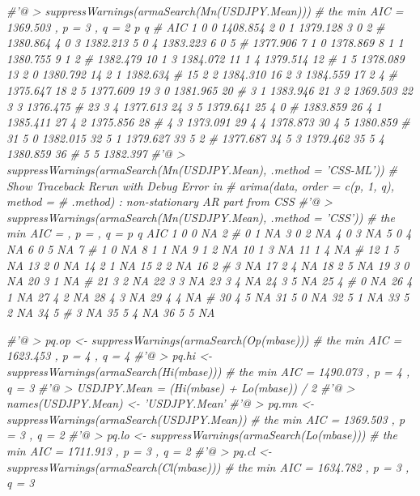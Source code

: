 \documentclass[]{tufte-book}
\newenvironment{Shaded}{}{}
\newcommand{\CommentTok}[1]{\textcolor[rgb]{0.38,0.63,0.69}{\textit{#1}}}
\begin{document}
\begin{Shaded}
\begin{Highlighting}[]
\CommentTok{#'@ > suppressWarnings(armaSearch(Mn(USDJPY.Mean)))}
\CommentTok{# the min AIC = 1369.503 , p = 3 , q = 2 p q}
\CommentTok{# AIC 1 0 0 1408.854 2 0 1 1379.128 3 0 2}
\CommentTok{# 1380.864 4 0 3 1382.213 5 0 4 1383.223 6 0 5}
\CommentTok{# 1377.906 7 1 0 1378.869 8 1 1 1380.755 9 1 2}
\CommentTok{# 1382.479 10 1 3 1384.072 11 1 4 1379.514 12}
\CommentTok{# 1 5 1378.089 13 2 0 1380.792 14 2 1 1382.634}
\CommentTok{# 15 2 2 1384.310 16 2 3 1384.559 17 2 4}
\CommentTok{# 1375.647 18 2 5 1377.609 19 3 0 1381.965 20}
\CommentTok{# 3 1 1383.946 21 3 2 1369.503 22 3 3 1376.475}
\CommentTok{# 23 3 4 1377.613 24 3 5 1379.641 25 4 0}
\CommentTok{# 1383.859 26 4 1 1385.411 27 4 2 1375.856 28}
\CommentTok{# 4 3 1373.091 29 4 4 1378.873 30 4 5 1380.859}
\CommentTok{# 31 5 0 1382.015 32 5 1 1379.627 33 5 2}
\CommentTok{# 1377.687 34 5 3 1379.462 35 5 4 1380.859 36}
\CommentTok{# 5 5 1382.397}
\CommentTok{#'@ > suppressWarnings(armaSearch(Mn(USDJPY.Mean), .method = 'CSS-ML'))}
\CommentTok{# Show Traceback Rerun with Debug Error in}
\CommentTok{# arima(data, order = c(p, 1, q), method =}
\CommentTok{# .method) : non-stationary AR part from CSS}
\CommentTok{#'@ > suppressWarnings(armaSearch(Mn(USDJPY.Mean), .method = 'CSS'))}
\CommentTok{# the min AIC = , p = , q = p q AIC 1 0 0 NA 2}
\CommentTok{# 0 1 NA 3 0 2 NA 4 0 3 NA 5 0 4 NA 6 0 5 NA 7}
\CommentTok{# 1 0 NA 8 1 1 NA 9 1 2 NA 10 1 3 NA 11 1 4 NA}
\CommentTok{# 12 1 5 NA 13 2 0 NA 14 2 1 NA 15 2 2 NA 16 2}
\CommentTok{# 3 NA 17 2 4 NA 18 2 5 NA 19 3 0 NA 20 3 1 NA}
\CommentTok{# 21 3 2 NA 22 3 3 NA 23 3 4 NA 24 3 5 NA 25 4}
\CommentTok{# 0 NA 26 4 1 NA 27 4 2 NA 28 4 3 NA 29 4 4 NA}
\CommentTok{# 30 4 5 NA 31 5 0 NA 32 5 1 NA 33 5 2 NA 34 5}
\CommentTok{# 3 NA 35 5 4 NA 36 5 5 NA}


\CommentTok{#'@ > pq.op <- suppressWarnings(armaSearch(Op(mbase)))}
\CommentTok{# the min AIC = 1623.453 , p = 4 , q = 4}
\CommentTok{#'@ > pq.hi <- suppressWarnings(armaSearch(Hi(mbase)))}
\CommentTok{# the min AIC = 1490.073 , p = 4 , q = 3}
\CommentTok{#'@ > USDJPY.Mean = (Hi(mbase) + Lo(mbase)) / 2}
\CommentTok{#'@ > names(USDJPY.Mean) <- 'USDJPY.Mean'}
\CommentTok{#'@ > pq.mn <- suppressWarnings(armaSearch(USDJPY.Mean))}
\CommentTok{# the min AIC = 1369.503 , p = 3 , q = 2}
\CommentTok{#'@ > pq.lo <- suppressWarnings(armaSearch(Lo(mbase)))}
\CommentTok{# the min AIC = 1711.913 , p = 3 , q = 2}
\CommentTok{#'@ > pq.cl <- suppressWarnings(armaSearch(Cl(mbase)))}
\CommentTok{# the min AIC = 1634.782 , p = 3 , q = 3}
\end{Highlighting}
\end{Shaded}
\end{document}
